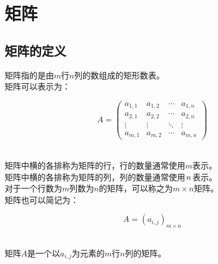 \documentclass[UTF8]{ctexart}
\begin{document}
\newpage

\section{矩阵}

\subsection{矩阵的定义}
    矩阵指的是由$m$行$n$列的数组成的矩形数表。\\[3mm]
    矩阵可以表示为：
    \begin{large}
        \begin{equation*}
            A=
            \begin{pmatrix}
                a_{1,1}&a_{1,2}&\cdots&a_{1,n}\\
                a_{2,1}&a_{2,2}&\cdots&a_{2,n}\\
                \vdots&\vdots&\ddots&\vdots\\
                a_{m,1}&a_{m,2}&\cdots&a_{m,n}
            \end{pmatrix}
        \end{equation*}
    \end{large}\\
    矩阵中横的各排称为矩阵的行，行的数量通常使用$m$表示。\\[3mm]
    矩阵中横的各排称为矩阵的列，列的数量通常使用$\hspace{1.0pt}n\hspace{1.0pt}$表示。\\[3mm]
    对于一个行数为$m$列数为$n$的矩阵，可以称之为$m\times n$矩阵。\\[5mm]
    矩阵也可以简记为：
    \begin{large}
        \begin{equation*}
            A=(a_{i,j})_{m\times n}
        \end{equation*}
    \end{large}\\
    矩阵$A$是一个以$a_{i,j}$为元素的$m$行$n$列的矩阵。
\end{document}
